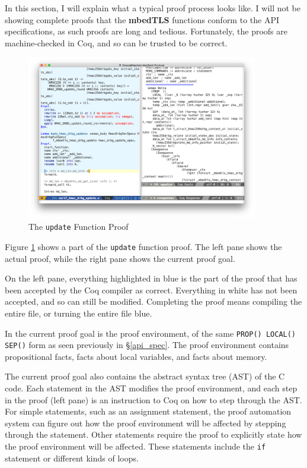 \documentclass[pageno]{jpaper}
\newcommand{\stdtitle}[1]{\textbf{#1}}
\begin{document}
In this section, I will explain what a typical proof process looks like. I will not be showing complete proofs that the \stdtitle{mbedTLS} functions conform to the API specifications, as such proofs are long and tedious. Fortunately, the proofs are machine-checked in Coq, and so can be trusted to be correct.
\begin{figure}[h]
\centering
\includegraphics[width=0.9\textwidth]{before_forward}
\caption{The \lstinline{update} Function Proof}
\label{figure:before_forward}
\end{figure}

Figure \ref{figure:before_forward} shows a part of the \lstinline{update} function proof. The left pane shows the actual proof, while the right pane shows the current proof goal.

On the left pane, everything highlighted in blue is the part of the proof that has been accepted by the Coq compiler as correct. Everything in white has not been accepted, and so can still be modified. Completing the proof means compiling the entire file, or turning the entire file blue.

In the current proof goal is the proof environment, of the same \lstinline{PROP() LOCAL() SEP()} form as seen previously in \S \ref{api_spec}. The proof environment contains propositional facts, facts about local variables, and facts about memory.

The current proof goal also contains the abstract syntax tree (AST) of the C code. Each statement in the AST modifies the proof environment, and each step in the proof (left pane) is an instruction to Coq on how to step through the AST. For simple statements, such as an assignment statement, the proof automation system can figure out how the proof environment will be affected by stepping through the statement. Other statements require the proof to explicitly state how the proof environment will be affected. These statements include the \lstinline{if} statement or different kinds of loops.
\end{document}
